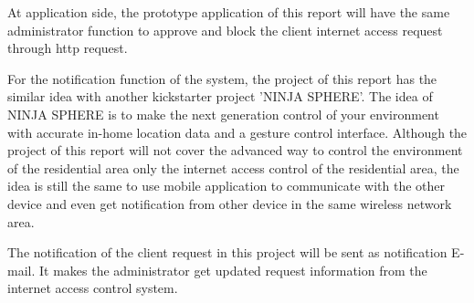 \par At application side, the prototype application of this report will have the same administrator function to approve and block the client internet access request through http request.
\par For the notification function of the system, the project of this report has the similar idea with another kickstarter project 'NINJA SPHERE'\cite{ninja_sphere}. The idea of NINJA SPHERE is to make the next generation control of your environment with accurate in-home location data and a gesture control interface. Although the project of this report will not cover the advanced way to control the environment of the residential area only the internet access control of the residential area, the idea is still the same to use mobile application to communicate with the other device and even get notification from other device in the same wireless network area. 
\par The notification of the client request in this project will be sent as notification E-mail. It makes the administrator get updated request information from the internet access control system.

